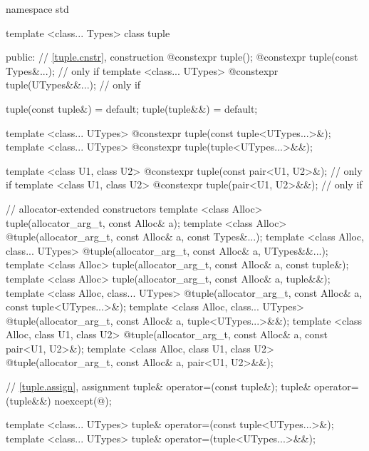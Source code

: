 \begin{codeblock}
namespace std {
  template <class... Types>
    class tuple  {
    public:
      // \ref{tuple.cnstr},  construction
      @\EXPLICIT@ constexpr tuple();
      @\EXPLICIT@ constexpr tuple(const Types&...);         // only if 
      template <class... UTypes>
        @\EXPLICIT@ constexpr tuple(UTypes&&...);           // only if 

      tuple(const tuple&) = default;
      tuple(tuple&&) = default;

      template <class... UTypes>
        @\EXPLICIT@ constexpr tuple(const tuple<UTypes...>&);
      template <class... UTypes>
        @\EXPLICIT@ constexpr tuple(tuple<UTypes...>&&);

      template <class U1, class U2>
        @\EXPLICIT@ constexpr tuple(const pair<U1, U2>&);   // only if 
      template <class U1, class U2>
        @\EXPLICIT@ constexpr tuple(pair<U1, U2>&&);        // only if 

      // allocator-extended constructors
      template <class Alloc>
        tuple(allocator_arg_t, const Alloc& a);
      template <class Alloc>
        @\EXPLICIT@ tuple(allocator_arg_t, const Alloc& a, const Types&...);
      template <class Alloc, class... UTypes>
        @\EXPLICIT@ tuple(allocator_arg_t, const Alloc& a, UTypes&&...);
      template <class Alloc>
        tuple(allocator_arg_t, const Alloc& a, const tuple&);
      template <class Alloc>
        tuple(allocator_arg_t, const Alloc& a, tuple&&);
      template <class Alloc, class... UTypes>
        @\EXPLICIT@ tuple(allocator_arg_t, const Alloc& a, const tuple<UTypes...>&);
      template <class Alloc, class... UTypes>
        @\EXPLICIT@ tuple(allocator_arg_t, const Alloc& a, tuple<UTypes...>&&);
      template <class Alloc, class U1, class U2>
        @\EXPLICIT@ tuple(allocator_arg_t, const Alloc& a, const pair<U1, U2>&);
      template <class Alloc, class U1, class U2>
        @\EXPLICIT@ tuple(allocator_arg_t, const Alloc& a, pair<U1, U2>&&);

      // \ref{tuple.assign},  assignment
      tuple& operator=(const tuple&);
      tuple& operator=(tuple&&) noexcept(@\seebelow@);

      template <class... UTypes>
        tuple& operator=(const tuple<UTypes...>&);
      template <class... UTypes>
        tuple& operator=(tuple<UTypes...>&&);

}}
\end{codeblock}

